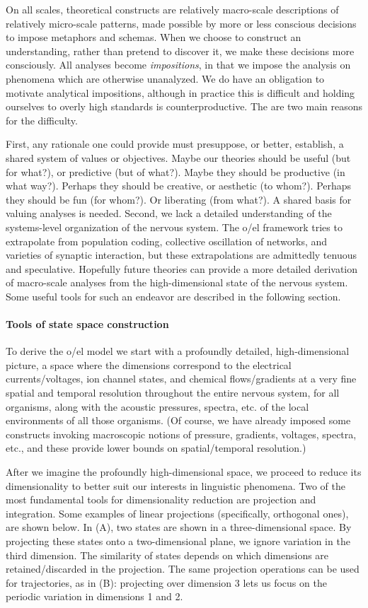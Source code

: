   On all scales, theoretical constructs are relatively macro-scale descriptions of relatively micro-scale patterns, made possible by more or less conscious decisions to impose metaphors and schemas. When we choose to construct an understanding, rather than pretend to discover it, we make these decisions more consciously. All analyses become \textit{impositions}, in that we impose the analysis on phenomena which are otherwise unanalyzed. We do have an obligation to motivate analytical impositions, although in practice this is difficult and holding ourselves to overly high standards is counterproductive. The are two main reasons for the difficulty. 

  First, any rationale one could provide must presuppose, or better, establish, a shared system of values or objectives. Maybe our theories should be useful (but for what?), or predictive (but of what?). Maybe they should be productive (in what way?). Perhaps they should be creative, or aesthetic (to whom?). Perhaps they should be fun (for whom?). Or liberating (from what?). A shared basis for valuing analyses is needed. Second, we lack a detailed understanding of the systems-level organization of the nervous system. The o/el framework tries to extrapolate from population coding, collective oscillation of networks, and varieties of synaptic interaction, but these extrapolations are admittedly tenuous and speculative. Hopefully future theories can provide a more detailed derivation of macro-scale analyses from the high-dimensional state of the nervous system. Some useful tools for such an endeavor are described in the following section.

\paragraph{Tools of state space construction}

To derive the o/el model we start with a profoundly detailed, high-dimensional picture, a space where the dimensions correspond to the electrical currents/voltages, ion channel states, and chemical flows/gradients at a very fine spatial and temporal resolution throughout the entire nervous system, for all organisms, along with the acoustic pressures, spectra, etc. of the local environments of all those organisms. (Of course, we have already imposed some constructs invoking macroscopic notions of pressure, gradients, voltages, spectra, etc., and these provide lower bounds on spatial/temporal resolution.) 

  After we imagine the profoundly high-dimensional space, we proceed to reduce its dimensionality to better suit our interests in linguistic phenomena. Two of the most fundamental tools for dimensionality reduction are projection and integration. Some examples of linear projections (specifically, orthogonal ones), are shown below. In (A), two states are shown in a three-dimensional space. By projecting these states onto a two-dimensional plane, we ignore variation in the third dimension. The similarity of states depends on which dimensions are retained/discarded in the projection. The same projection operations can be used for trajectories, as in (B): projecting over dimension 3 lets us focus on the periodic variation in dimensions 1 and 2.

